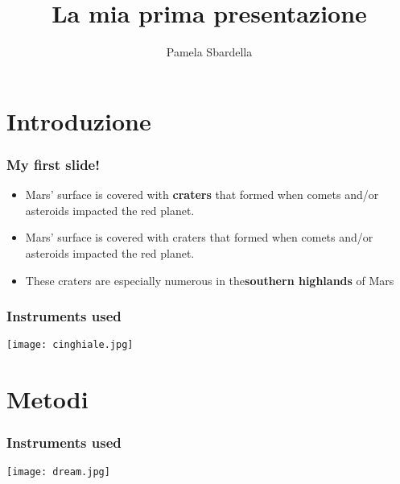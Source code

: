 \documentclass{beamer}
\title{La mia prima presentazione}
\author{Pamela Sbardella}
\begin{document}
\maketitle




\section{Introduzione}

\begin{frame}
\frametitle{My first slide!}
\begin{itemize}  %
\item Mars' surface is covered with \textbf{craters} that formed when comets and/or asteroids impacted the red planet.  %
\item Mars' surface is covered with craters that formed when comets and/or asteroids impacted the red planet.
\item \pause These craters are especially numerous in the\textbf{southern highlands} of Mars   %
\end{itemize} 
\end{frame}


\begin{frame}
\frametitle{Instruments used}
\centering
\texttt{[image: cinghiale.jpg]}  %
\end{frame}



\section{Metodi}

\begin{frame}
\frametitle{Instruments used}
\centering
\texttt{[image: dream.jpg]}
\end{frame}
\end{document}
